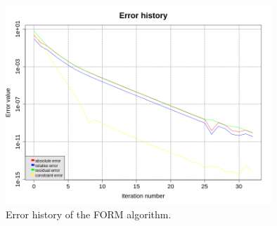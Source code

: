              \begin{figure}[H]
               \begin{center}
                 \includegraphics[width=10cm]{Figures/ErrorHistoryFORM.png}
               \end{center}
               \caption{Error history of the FORM algorithm.}
               \label{ErrorHist}
             \end{figure}
